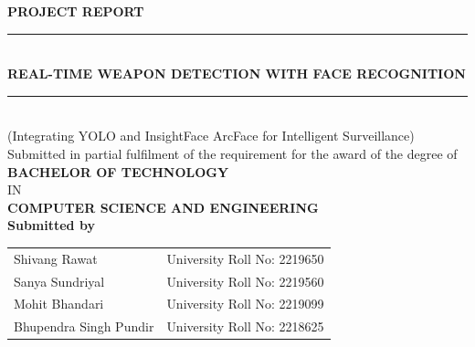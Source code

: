 \documentclass[12pt,a4paper]{report}
\begin{document}
\begin{titlepage}
\centering
\vspace*{0.6cm}


{\fontsize{18}{20}\selectfont\bfseries PROJECT REPORT}\\[0.3cm]

\noindent\rule{\textwidth}{0.5pt}\\[0.3cm]
{\fontsize{16}{20}\selectfont\bfseries REAL-TIME WEAPON DETECTION WITH FACE RECOGNITION}\\[0.3cm]
\noindent\rule{\textwidth}{0.5pt}\\[0.5cm]

{\fontsize{12}{14.4}\selectfont (Integrating YOLO and InsightFace ArcFace for Intelligent Surveillance)}\\[0.5cm]

{\fontsize{12}{14.4}\selectfont Submitted in partial fulfilment of the requirement for the award of the degree of}\\[0.5cm]

{\fontsize{14}{17}\selectfont\bfseries BACHELOR OF TECHNOLOGY}\\[0.3cm]
{\fontsize{12}{14.4}\selectfont IN}\\[0.3cm]
{\fontsize{14}{17}\selectfont\bfseries COMPUTER SCIENCE AND ENGINEERING}\\[0.5cm]

{\fontsize{12}{14.4}\selectfont\bfseries Submitted by}\\[0.3cm]

\begin{tabular}{ll}
Shivang Rawat           & \hspace{0cm} University Roll No: 2219650 \\[0.0cm]
Sanya Sundriyal         & \hspace{0cm} University Roll No: 2219560 \\[0.0cm]
Mohit Bhandari          & \hspace{0cm} University Roll No: 2219099 \\[0.0cm]
Bhupendra Singh Pundir  & \hspace{0cm} University Roll No: 2218625 \\
\end{tabular}\\[0.5cm]


\end{titlepage}
\end{document}

